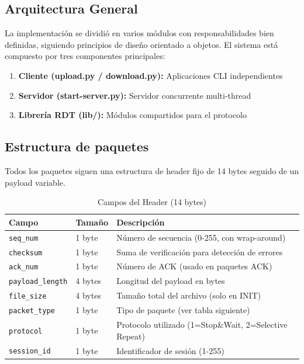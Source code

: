 
\subsection{Arquitectura General}
La implementación se dividió en varios módulos con responsabilidades bien definidas, siguiendo principios de diseño orientado a objetos.
El sistema está compuesto por tres componentes principales:

\begin{enumerate}
    \item \textbf{Cliente (upload.py / download.py):} Aplicaciones CLI independientes
    \item \textbf{Servidor (start-server.py):} Servidor concurrente multi-thread
    \item \textbf{Librería RDT (lib/):} Módulos compartidos para el protocolo
\end{enumerate}

\subsection{Estructura de paquetes}
Todos los paquetes siguen una estructura de header fijo de 14 bytes seguido de un payload variable.

\begin{table}[H]
\centering
\begin{tabular}{@{}lll@{}}
\toprule
\textbf{Campo}        & \textbf{Tamaño} & \textbf{Descripción} \\ \midrule
\texttt{seq\_num}     & 1 byte  & Número de secuencia (0-255, con wrap-around) \\
\texttt{checksum}     & 1 byte  & Suma de verificación para detección de errores \\
\texttt{ack\_num}     & 1 byte  & Número de ACK (usado en paquetes ACK) \\
\texttt{payload\_length} & 4 bytes & Longitud del payload en bytes \\
\texttt{file\_size}   & 4 bytes & Tamaño total del archivo (solo en INIT) \\
\texttt{packet\_type} & 1 byte  & Tipo de paquete (ver tabla siguiente) \\
\texttt{protocol}     & 1 byte  & Protocolo utilizado (1=Stop\&Wait, 2=Selective Repeat) \\
\texttt{session\_id}  & 1 byte  & Identificador de sesión (1-255) \\ \bottomrule
\end{tabular}
\caption{Campos del Header (14 bytes)}
\end{table}

